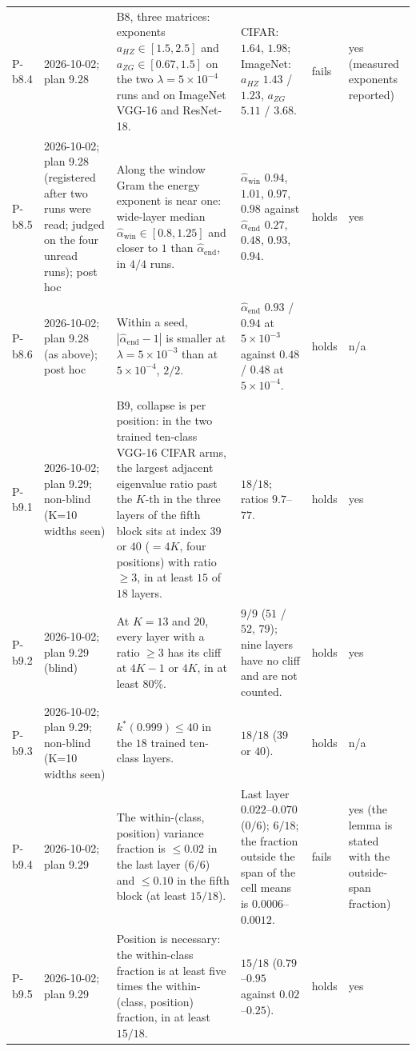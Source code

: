 \begin{longtable}{p{1.1cm}p{1.4cm}p{6.2cm}p{4.6cm}p{2.0cm}p{1.6cm}}
P-b8.4 & 2026-10-02; plan 9.28 & B8, three matrices: exponents $a_{HZ} \in [1.5, 2.5]$ and $a_{ZG} \in [0.67, 1.5]$ on the two $\lambda = 5\!\times\!10^{-4}$ runs and on ImageNet VGG-16 and ResNet-18. & CIFAR: $1.64$, $1.98$; ImageNet: $a_{HZ}$ $1.43$ / $1.23$, $a_{ZG}$ $5.11$ / $3.68$. & fails & yes (measured exponents reported) \\
P-b8.5 & 2026-10-02; plan 9.28 (registered after two runs were read; judged on the four unread runs); post hoc & Along the window Gram the energy exponent is near one: wide-layer median $\hat\alpha_{\mathrm{win}} \in [0.8, 1.25]$ and closer to $1$ than $\hat\alpha_{\mathrm{end}}$, in $4/4$ runs. & $\hat\alpha_{\mathrm{win}}$ $0.94$, $1.01$, $0.97$, $0.98$ against $\hat\alpha_{\mathrm{end}}$ $0.27$, $0.48$, $0.93$, $0.94$. & holds & yes \\
P-b8.6 & 2026-10-02; plan 9.28 (as above); post hoc & Within a seed, $|\hat\alpha_{\mathrm{end}} - 1|$ is smaller at $\lambda = 5\!\times\!10^{-3}$ than at $5\!\times\!10^{-4}$, $2/2$. & $\hat\alpha_{\mathrm{end}}$ $0.93$ / $0.94$ at $5\!\times\!10^{-3}$ against $0.48$ / $0.48$ at $5\!\times\!10^{-4}$. & holds & n/a \\
P-b9.1 & 2026-10-02; plan 9.29; non-blind (K=10 widths seen) & B9, collapse is per position: in the two trained ten-class VGG-16 CIFAR arms, the largest adjacent eigenvalue ratio past the $K$-th in the three layers of the fifth block sits at index $39$ or $40$ ($= 4K$, four positions) with ratio $\ge 3$, in at least $15$ of $18$ layers. & $18/18$; ratios $9.7$--$77$. & holds & yes \\
P-b9.2 & 2026-10-02; plan 9.29 (blind) & At $K = 13$ and $20$, every layer with a ratio $\ge 3$ has its cliff at $4K - 1$ or $4K$, in at least $80\%$. & $9/9$ ($51$ / $52$, $79$); nine layers have no cliff and are not counted. & holds & yes \\
P-b9.3 & 2026-10-02; plan 9.29; non-blind (K=10 widths seen) & $k^*(0.999) \le 40$ in the $18$ trained ten-class layers. & $18/18$ ($39$ or $40$). & holds & n/a \\
P-b9.4 & 2026-10-02; plan 9.29 & The within-(class, position) variance fraction is $\le 0.02$ in the last layer ($6/6$) and $\le 0.10$ in the fifth block (at least $15/18$). & Last layer $0.022$--$0.070$ ($0/6$); $6/18$; the fraction outside the span of the cell means is $0.0006$--$0.0012$. & fails & yes (the lemma is stated with the outside-span fraction) \\
P-b9.5 & 2026-10-02; plan 9.29 & Position is necessary: the within-class fraction is at least five times the within-(class, position) fraction, in at least $15/18$. & $15/18$ ($0.79$--$0.95$ against $0.02$--$0.25$). & holds & yes \\

\end{longtable}
